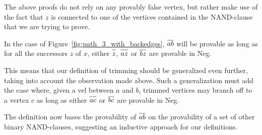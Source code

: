 \FloatBarrier
The above proofs do not rely on any provably false vertex, but rather make use of the fact that $z$ is connected to one of the vertices contained in the NAND-clause that we are trying to prove.

In the case of Figure~\ref{fig:path_3_with_backedges}, $\ol{ab}$ will be provable as long as for all the successors $z$ of $x$, either $\ol{z}$, $\ol{az}$ or $\ol{bz}$ are provable in Neg.

This means that our definition of trimming should be generalized even further, taking into account the observation made above.
Such a generalization must add the case where, given a vel between $a$ and $b$, trimmed vertices may branch off to a vertex $c$ as long as either $\ol{ac}$ or $\ol{bc}$ are provable in Neg.

The definition now bases the provability of $\ol{ab}$ on the provability of a set of other binary NAND-clauses, suggesting an inductive approach for our definitions.
